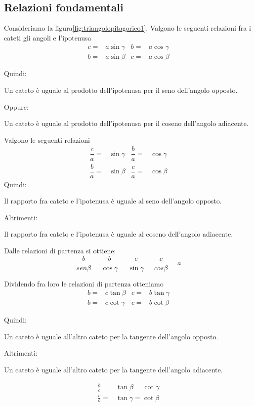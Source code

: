 \subsection{Relazioni fondamentali}
\begin{teoremat}{}{}
Consideriamo la figura\nobs\vref{fig:triangolopitagorico1}. Valgono le seguenti relazioni fra i cateti gli angoli e l'ipotenusa
\begin{align*}
c=&a\sin\gamma&b=&a\cos\gamma\\
b=&a\sin\beta&c=&a\cos\beta
\end{align*}
\end{teoremat}
\noindent Quindi:\par
Un cateto è uguale  al prodotto dell'ipotenusa per il seno dell'angolo opposto.\par 
\noindent Oppure:\par 
Un cateto è uguale al prodotto dell'ipotenusa per il coseno dell'angolo adiacente.\par
\noindent Valgono le seguenti relazioni
\begin{align*}
\dfrac{c}{a}=&\sin\gamma&\dfrac{b}{a}=&\cos\gamma\\
\dfrac{b}{a}=&\sin\beta&\dfrac{c}{a}=&\cos\beta
\end{align*}
\noindent Quindi:\par
Il rapporto fra  cateto e l'ipotenusa è uguale al seno dell'angolo opposto.\par
\noindent Altrimenti:\par
Il rapporto fra  cateto e l'ipotenusa è uguale al coseno dell'angolo adiacente.\par 
\noindent Dalle relazioni di partenza si ottiene:
\[\dfrac{b}{sen\beta}=\dfrac{b}{\cos\gamma}=\dfrac{c}{\sin\gamma}=\dfrac{c}{cos\beta}=a \]
\begin{teoremat}{}{}
Dividendo fra loro le relazioni di partenza otteniamo
\begin{align*}
b=&c\tan\beta&c=&b\tan\gamma\\
b=&c\cot\gamma&c=&b\cot\beta
\end{align*}
\end{teoremat}
\noindent Quindi:\par
Un cateto è uguale all'altro cateto per la tangente dell'angolo opposto.\par \noindent Altrimenti:\par 
Un cateto è uguale all'altro cateto per la tangente dell'angolo adiacente.\par
\begin{align*}
\frac{b}{c}=&\tan\beta=\cot\gamma\\
\frac{c}{b}=&\tan\gamma=\cot\beta
\end{align*}
